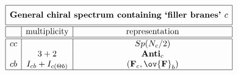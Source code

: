 \begin{equation*}
      \begin{array}{|c|c|c|} \hline
        \multicolumn{3}{|c|}{\rule[-3mm]{0mm}{8mm} 
\text{\bf General chiral spectrum containing `filler branes' $c$}} \\ \hline\hline
       & \text{multiplicity} & \text{representation}
\\ \hline\hline
cc  & & Sp(N_c/2)\\
 &  3+2 & {\bf Anti}_{c} \\
cb  & I_{cb} + I_{ c(\Theta b)}  & ({\bf F}_{c},\ov{\bf F}_b)\\\hline 
      \end{array}
    \end{equation*}

